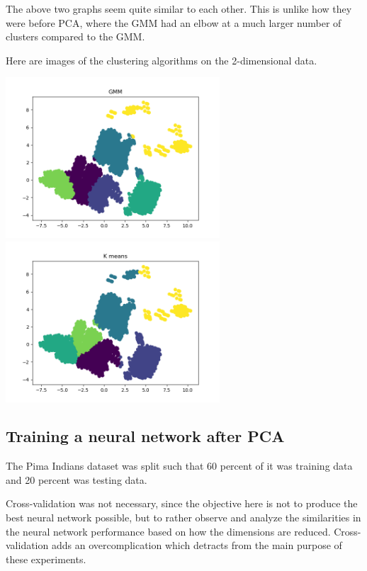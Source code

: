 \documentclass[11pt]{article}
\begin{document}
            The above two graphs seem quite similar to each other. This is unlike how
            they were before PCA, where the GMM had an elbow at a much larger number
            of clusters compared to the GMM.

            Here are images of the clustering algorithms on the 2-dimensional data.

            \includegraphics[width=8cm]{../mushrooms/clustering2/cluster_gmm_pca.png}
            \includegraphics[width=8cm]{../mushrooms/clustering2/cluster_km_pca.png}

            \subsection{Training a neural network after PCA}

            The Pima Indians dataset was split such that 60 percent of it
            was training data and 20 percent was testing data.
            
            Cross-validation was not necessary, since the objective here is not
            to produce the best neural network possible, but to rather observe
            and analyze the similarities in the neural network performance
            based on how the dimensions are reduced. Cross-validation adds an
            overcomplication which detracts from the main purpose of these
            experiments.
            
\end{document}

